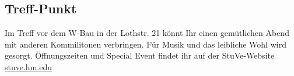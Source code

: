 \subsection{Treff-Punkt}
Im Treff vor dem W-Bau in der Lothstr. 21 könnt 
Ihr einen gemütlichen Abend mit anderen 
Kommilitonen verbringen. Für Musik und das 
leibliche Wohl wird gesorgt.\doublebreak
Öffnungszeiten und Special Event findet ihr auf der StuVe-Website 
\url{stuve.hm.edu}